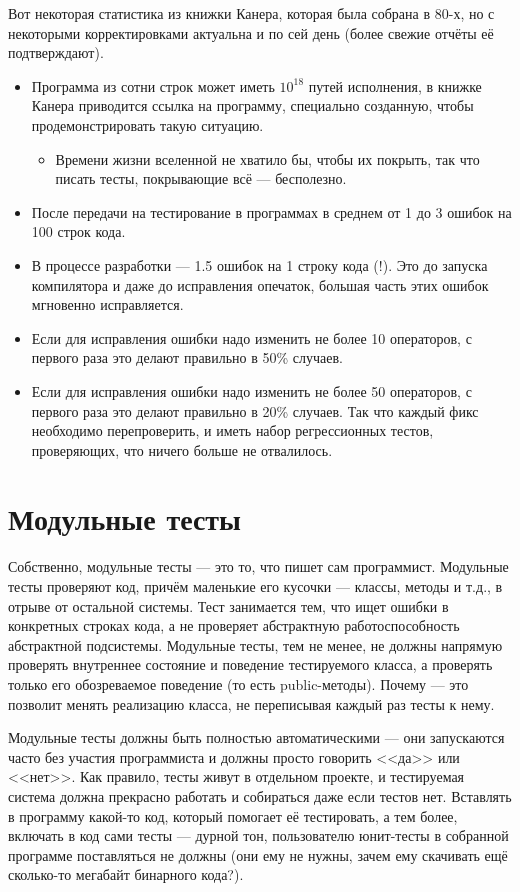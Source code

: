 \documentclass{../../text-style}
\begin{document}
Вот некоторая статистика из книжки Канера, которая была собрана в 80-х, но с некоторыми корректировками актуальна и по сей день (более свежие отчёты её подтверждают).

\begin{itemize}
    \item Программа из сотни строк может иметь $10^{18}$ путей исполнения, в книжке Канера приводится ссылка на программу, специально созданную, чтобы продемонстрировать такую ситуацию.
    \begin{itemize}
        \item Времени жизни вселенной не хватило бы, чтобы их покрыть, так что писать тесты, покрывающие всё --- бесполезно.
    \end{itemize}
    \item После передачи на тестирование в программах в среднем от 1 до 3 ошибок на 100 строк кода.
    \item В процессе разработки --- 1.5 ошибок на 1 строку кода (!). Это до запуска компилятора и даже до исправления опечаток, большая часть этих ошибок мгновенно исправляется.
    \item Если для исправления ошибки надо изменить не более 10 операторов, с первого раза это делают правильно в 50\% случаев.
    \item Если для исправления ошибки надо изменить не более 50 операторов, с первого раза это делают правильно в 20\% случаев. Так что каждый фикс необходимо перепроверить, и иметь набор регрессионных тестов, проверяющих, что ничего больше не отвалилось.
\end{itemize}

\section{Модульные тесты}

Собственно, модульные тесты --- это то, что пишет сам программист. Модульные тесты проверяют код, причём маленькие его кусочки --- классы, методы и т.д., в отрыве от остальной системы. Тест занимается тем, что ищет ошибки в конкретных строках кода, а не проверяет абстрактную работоспособность абстрактной подсистемы. Модульные тесты, тем не менее, не должны напрямую проверять внутреннее состояние и поведение тестируемого класса, а проверять только его обозреваемое поведение (то есть public-методы). Почему --- это позволит менять реализацию класса, не переписывая каждый раз тесты к нему.

Модульные тесты должны быть полностью автоматическими --- они запускаются часто без участия программиста и должны просто говорить <<да>> или <<нет>>. Как правило, тесты живут в отдельном проекте, и тестируемая система должна прекрасно работать и собираться даже если тестов нет. Вставлять в программу какой-то код, который помогает её тестировать, а тем более, включать в код сами тесты --- дурной тон, пользователю юнит-тесты в собранной программе поставляться не должны (они ему не нужны, зачем ему скачивать ещё сколько-то мегабайт бинарного кода?).
\end{document}
